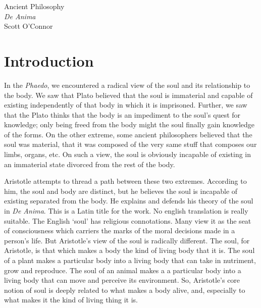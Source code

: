 \documentclass[11pt]{article}
\begin{document}
\thispagestyle{empty}
\begin{center} \LARGE{Ancient Philosophy\\ \emph{De Anima}}\\ \vspace*{2mm}
\large{Scott O'Connor}\end{center}
\thispagestyle{empty}\vspace*{3mm}
\vspace*{-8mm}


\section*{Introduction}
In the \emph{Phaedo}, we encountered a radical view of the soul and its relationship to the body. We saw that Plato believed that the soul is immaterial and capable of existing independently of that body in which it is imprisoned. Further, we saw that the Plato thinks that the body is an impediment to the soul's quest for knowledge; only being freed from the body might the soul finally gain knowledge of the forms. On the other extreme, some ancient philosophers believed that the soul was material, that it was composed of the very same stuff that composes our limbs, organs, etc. On such a view, the soul is obviously incapable of existing in an immaterial state divorced from the rest of the body. 

Aristotle attempts to thread a path between these two extremes. According to him, the soul and body are distinct, but he believes the soul is incapable of existing separated from the body. He explains and defends his theory of the soul in \emph{De Anima}. This is a Latin title for the work. No english translation is really suitable. The English `soul' has religious connotations. Many view it as the seat of consciousness which carriers the marks of the moral decisions made in a person's life. But Aristotle's view of the soul is radically different. The soul, for Aristotle, is that which makes a body the kind of living body that it is. The soul of a plant makes a particular body into a living body that can take in nutriment, grow and reproduce. The soul of an animal makes a a particular body into a living body that can move and perceive its environment. So, Aristotle's core notion of soul is deeply related to what makes a body alive, and, especially to what makes it the kind of living thing it is. 
\end{document}
